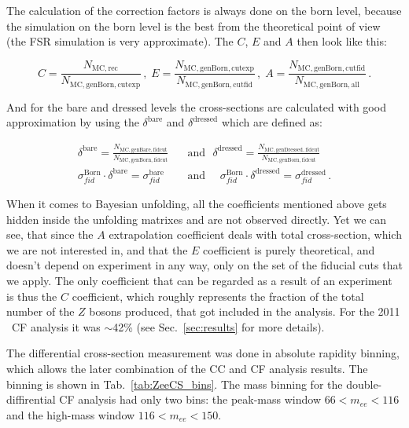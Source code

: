 The calculation of the correction factors is always done on the born level, because the simulation on the born level is the best from the theoretical point of view (the FSR simulation is very approximate). The $C$, $E$ and $A$ then look like this:

\begin{equation}
C = \frac{N_\mathrm{MC, rec}}{N_\mathrm{MC, genBorn, cutexp}}\,, \;
E = \frac{N_\mathrm{MC, genBorn, cutexp}}{N_\mathrm{MC, genBorn, cutfid}}\,, \;
A = \frac{N_\mathrm{MC, genBorn, cutfid}}{N_\mathrm{MC, genBorn, all}}\,.
\end{equation}

And for the bare and dressed levels the cross-sections are calculated with good approximation by using the $\delta^\mathrm{bare}$ and $\delta^\mathrm{dressed}$ which are defined as:

\begin{equation}
\begin{split}
  \delta^\mathrm{bare} = \frac{N_\mathrm{MC, genBare, fidcut}}{N_\mathrm{MC, genBorn, fidcut}}\:\:\:&\mbox{and}\:\:\:
  \delta^\mathrm{dressed} = \frac{N_\mathrm{MC, genDressed, fidcut}}{N_\mathrm{MC, genBorn, fidcut}}\\
  \sigma_{fid}^\mathrm{Born} \cdot \delta^\mathrm{bare} =
  \sigma_{fid}^\mathrm{bare} \:\:\:\:\:\:&\mbox{and}\:\:\:\:\:\:
  \sigma_{fid}^\mathrm{Born} \cdot \delta^\mathrm{dressed} =
  \sigma_{fid}^\mathrm{dressed} \,.
\end{split}
\end{equation}

When it comes to Bayesian unfolding, all the coefficients mentioned above gets hidden inside the unfolding matrixes and are not observed directly. Yet we can see, that since the $A$ extrapolation coefficient deals with total cross-section, which we are not interested in, and that the $E$ coefficient is purely theoretical, and doesn't depend on experiment in any way, only on the set of the fiducial cuts that we apply. The only coefficient that can be regarded as a result of an experiment is thus the $C$ coefficient, which roughly represents the fraction of the total number of the $Z$ bosons produced, that got included in the analysis. For the 2011 \Zee\ CF analysis it was $\sim$42\% (see Sec.~\ref{sec:results} for more details).

The differential cross-section measurement was done in absolute rapidity binning, which allows the later combination of the CC and CF analysis results. The binning is shown in Tab.~\ref{tab:ZeeCS_bins}. The mass binning for the double-diffirential CF analysis had only two bins: the peak-mass window $66 < m_{ee} < 116$ and the high-mass window $116 < m_{ee} < 150$.

